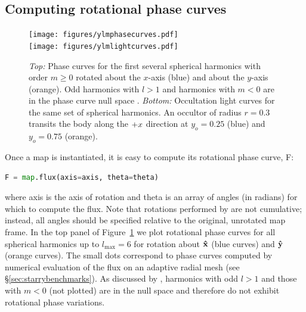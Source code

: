 \documentclass[modern]{aastex61}
\begin{document}
\subsection{Computing rotational phase curves}
\label{sec:starryphasecurves}
%
\begin{figure}[p!]
    \begin{centering}
    \texttt{[image: figures/ylmphasecurves.pdf]}
    \\[1em]
    \texttt{[image: figures/ylmlightcurves.pdf]}
    \caption{\label{fig:ylmlightcurves}
             \emph{Top:} Phase curves for the first several spherical
             harmonics with order $m \ge 0$ rotated about the $x$-axis
             (blue) and about the $y$-axis (orange).
             Odd harmonics with $l > 1$ and harmonics with $m < 0$ are
             in the phase curve null space \citep{CowanFuentesHaggard2013}.
             \emph{Bottom:} Occultation light curves for the same
             set of spherical harmonics. An occultor of radius $r=0.3$
             transits the body along the $+\mbox{$x$}$ direction at $y_o = 0.25$
             (blue) and $y_o = 0.75$ (orange). }
    \end{centering}
\end{figure}
%
Once a map is instantiated, it is easy to compute its rotational
phase curve, \textsf{F}:
%
\begin{lstlisting}[language=Python,firstnumber=last]
F = map.flux(axis=axis, theta=theta)
\end{lstlisting}
%
where \textsf{axis} is the axis of rotation and \textsf{theta} is an array of
angles (in radians) for which to compute the flux. Note that rotations performed
by \flux are not cumulative; instead, all angles should be specified
relative to the original, unrotated map frame.
%
In the top panel of Figure~\ref{fig:ylmlightcurves} we plot rotational phase curves
for all spherical harmonics
up to $l_\mathrm{max} = 6$ for rotation about $\mathbf{\hat{x}}$ (blue curves) and $\mathbf{\hat{y}}$
(orange curves). The small dots correspond to phase curves computed by numerical
evaluation of the flux on an adaptive radial mesh (see \S\ref{sec:starrybenchmarks}).
As discussed by \citet{CowanFuentesHaggard2013}, harmonics with
odd $l > 1$ and those with $m < 0$ (not plotted) are in the null space and
therefore do not exhibit rotational phase variations.

%
\end{document}

